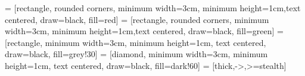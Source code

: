 

 = [rectangle, rounded corners, minimum width=3cm, minimum height=1cm,text centered, draw=black, fill=red]
 = [rectangle, rounded corners, minimum width=3cm, minimum height=1cm,text centered, draw=black, fill=green]
 = [rectangle, minimum width=3cm, minimum height=1cm, text centered, draw=black, fill=grey!30]
 = [diamond, minimum width=3cm, minimum height=1cm, text centered, draw=black, fill=dark!60]
 = [thick,->,>=stealth]
